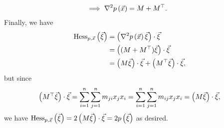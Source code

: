 \documentclass[main.tex]{subfiles}
\begin{document}
\begin{soln}
\begin{align*}
        &\implies \nabla^2p\left( \vec{x} \right) = M + M^\top.
    \end{align*}
    Finally, we have
    \begin{align*}
        \operatorname{Hess}_{p,\vec{x}}\left( \vec\xi \right) &= \left( \nabla^2p\left( \vec{x} \right)\vec\xi \right)\cdot\vec\xi \\
        &= \left( (M + M^\top)\vec\xi \right)\cdot \vec\xi \\
        &= \left( M\vec\xi \right)\cdot \vec\xi + \left( M^\top\vec\xi \right)\cdot \vec\xi,
    \end{align*}
    but since
    \[\left( M^\top\vec\xi \right)\cdot \vec\xi = \sum_{i = 1}^n\sum_{j = 1}^n m_{ji}x_jx_i = \sum_{i = 1}^n\sum_{j = 1}^n m_{ij}x_jx_i = \left( M\vec\xi \right)\cdot \vec\xi,\]
    we have $\operatorname{Hess}_{p, \vec{x}}\left( \vec\xi \right) = 2\left( M\vec\xi \right)\cdot \vec\xi = 2p\left( \vec\xi \right)$ as desired.
\end{soln}
\eject
\end{document}
